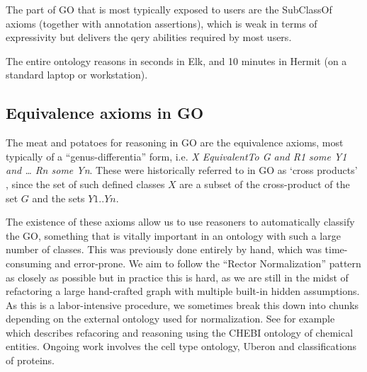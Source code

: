 \documentclass{llncs}
\begin{document}
The part of GO that is most typically exposed to users are the
SubClassOf axioms (together with annotation assertions), which is weak
in terms of expressivity but delivers the qery abilities required by
most users.

The entire ontology reasons in seconds in Elk\cite{kazakov2012elk}, and 10
minutes in Hermit (on a standard laptop or workstation).

\subsection{Equivalence axioms in GO}

The meat and potatoes for reasoning in GO are the equivalence axioms,
most typically of a ``genus-differentia'' form, i.e. \emph{X
  EquivalentTo G and R1 some Y1 and … Rn some Yn}. These were
historically referred to in GO as `cross
products' \cite{Mungall2010GOXP}, since the set of such defined classes
$X$ are a subset of the cross-product of the set $G$ and the sets
$Y1..Yn$.

The existence of these axioms allow us to use reasoners to
automatically classify the GO, something that is vitally important in
an ontology with such a large number of classes. This was previously
done entirely by hand, which was time-consuming and error-prone. We
aim to follow the ``Rector Normalization''
pattern\cite{rector_modularisation_2003} as closely as possible but in
practice this is hard, as we are still in the midst of refactoring a
large hand-crafted graph with multiple built-in hidden assumptions. As
this is a labor-intensive procedure, we sometimes break this down into
chunks depending on the external ontology used for normalization. See
for example \cite{Hill2013} which describes refacoring and reasoning
using the CHEBI ontology of chemical entities. Ongoing work involves
the cell type ontology, Uberon and classifications of proteins.

\end{document}
